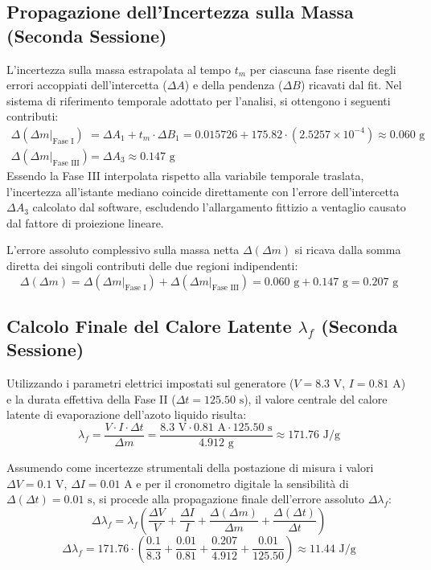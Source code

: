 \documentclass[a4paper,12pt]{article}
\begin{document}
\subsection{Propagazione dell'Incertezza sulla Massa (Seconda Sessione)}
L'incertezza sulla massa estrapolata al tempo $t_m$ per ciascuna fase risente degli errori accoppiati dell'intercetta ($\Delta A$) e della pendenza ($\Delta B$) ricavati dal fit. Nel sistema di riferimento temporale adottato per l'analisi, si ottengono i seguenti contributi:
\begin{align*}
\Delta(\Delta m|_{\text{Fase I}}) &= \Delta A_1 + t_m \cdot \Delta B_1 = 0.015726 + 175.82 \cdot (2.5257 \times 10^{-4}) \approx 0.060\text{ g} \\
\Delta(\Delta m|_{\text{Fase III}}) &= \Delta A_3 \approx 0.147\text{ g}
\end{align*}
Essendo la Fase III interpolata rispetto alla variabile temporale traslata, l'incertezza all'istante mediano coincide direttamente con l'errore dell'intercetta $\Delta A_3$ calcolato dal software, escludendo l'allargamento fittizio a ventaglio causato dal fattore di proiezione lineare.

L'errore assoluto complessivo sulla massa netta $\Delta(\Delta m)$ si ricava dalla somma diretta dei singoli contributi delle due regioni indipendenti:
\begin{equation*}
\Delta(\Delta m) = \Delta(\Delta m|_{\text{Fase I}}) + \Delta(\Delta m|_{\text{Fase III}}) = 0.060\text{ g} + 0.147\text{ g} = 0.207\text{ g}
\end{equation*}

\subsection{Calcolo Finale del Calore Latente $\lambda_f$ (Seconda Sessione)}
Utilizzando i parametri elettrici impostati sul generatore ($V = 8.3\text{ V}$, $I = 0.81\text{ A}$) e la durata effettiva della Fase II ($\Delta t = 125.50\text{ s}$), il valore centrale del calore latente di evaporazione dell'azoto liquido risulta:
\begin{equation*}
\lambda_f = \frac{V \cdot I \cdot \Delta t}{\Delta m} = \frac{8.3\text{ V} \cdot 0.81\text{ A} \cdot 125.50\text{ s}}{4.912\text{ g}} \approx 171.76\text{ J/g}
\end{equation*}

Assumendo come incertezze strumentali della postazione di misura i valori $\Delta V = 0.1\text{ V}$, $\Delta I = 0.01\text{ A} $ e per il cronometro digitale la sensibilità di $\Delta(\Delta t) = 0.01\text{ s}$, si procede alla propagazione finale dell'errore assoluto $\Delta \lambda_f$:
\begin{equation*}
\Delta \lambda_f = \lambda_f \left( \frac{\Delta V}{V} + \frac{\Delta I}{I} + \frac{\Delta(\Delta m)}{\Delta m} + \frac{\Delta(\Delta t)}{\Delta t} \right)
\end{equation*}
\begin{equation*}
\Delta \lambda_f = 171.76 \cdot \left( \frac{0.1}{8.3} + \frac{0.01}{0.81} + \frac{0.207}{4.912} + \frac{0.01}{125.50} \right) \approx 11.44\text{ J/g}
\end{equation*}
\end{document}

